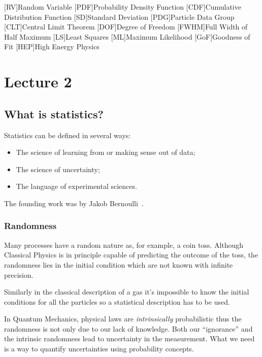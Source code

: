 \documentclass[
	10pt,
	draft
]{scrreprt}
\begin{document}
\begin{acronym}[FWHM]
	[RV]{Random Variable}
	[PDF]{Probability Density Function}
	[CDF]{Cumulative Distribution Function}
	[SD]{Standard Deviation}
	[PDG]{Particle Data Group}
	[CLT]{Central Limit Theorem}
	[DOF]{Degree of Freedom}
	[FWHM]{Full Width of Half Maximum}
	[LS]{Least Squares}
	[ML]{Maximum Likelihood}
	[GoF]{Goodness of Fit}
	[HEP]{High Energy Physics}
\end{acronym}

\tableofcontents

	\chapter{Lecture 2}
		\section{What is statistics?}

Statistics can be defined in several ways:
\begin{itemize}
	\item
 The science of learning from or making sense out of data;
	\item
The science of uncertainty;
	\item
The language of experimental sciences.
\end{itemize}
The founding work was by Jakob Bernoulli~\cite{bernoulli}.

		\subsection{Randomness}
Many processes have a random nature as, for example, a coin toss.
Although Classical Physics is in principle capable of predicting the outcome of the toss, the randomness lies in the initial condition which are not known with infinite precision. 


Similarly in the classical description of a gas it's impossible to know the initial conditions for all the particles so a statistical description has to be used.


In Quantum Mechanics, physical laws are \emph{intrinsically} probabilistic thus the randomness is not only due to our lack of knowledge.
Both our ``ignorance'' and the intrinsic randomness lead to uncertainty in the measurement.
What we need is a way to quantify uncertainties using probability concepts.
\end{document}
